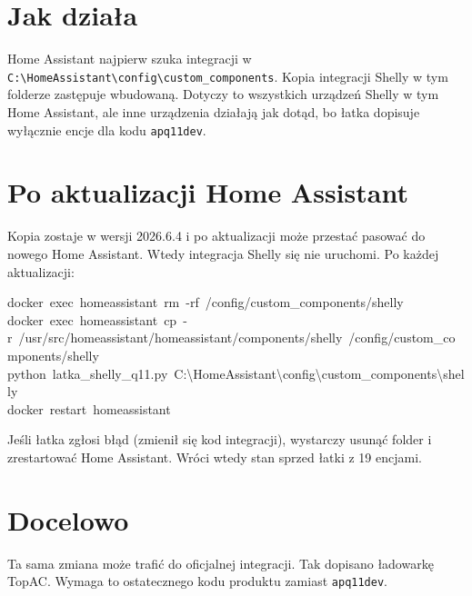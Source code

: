 \documentclass[11pt,a4paper]{article}
\begin{document}
\section*{Jak działa}

Home Assistant najpierw szuka integracji w \texttt{C:\allowbreak{}\textbackslash{}HomeAssistant\textbackslash{}config\textbackslash{}custom\_\allowbreak{}components}. Kopia integracji Shelly w tym folderze zastępuje wbudowaną. Dotyczy to wszystkich urządzeń Shelly w tym Home Assistant, ale inne urządzenia działają jak dotąd, bo łatka dopisuje wyłącznie encje dla kodu \texttt{apq11dev}.


\section*{Po aktualizacji Home Assistant}

Kopia zostaje w wersji 2026.6.4 i po aktualizacji może przestać pasować do nowego Home Assistant. Wtedy integracja Shelly się nie uruchomi. Po każdej aktualizacji:


\begin{kodbox}
\mbox{}docker\ exec\ homeassistant\ rm\ -rf\ /config/custom\_components/shelly\\
\mbox{}docker\ exec\ homeassistant\ cp\ -r\ /usr/src/homeassistant/homeassistant/components/shelly\ /config/custom\_co\\
\hspace*{1.2em}mponents/shelly\\
\mbox{}python\ latka\_shelly\_q11.py\ C:\textbackslash{}HomeAssistant\textbackslash{}config\textbackslash{}custom\_components\textbackslash{}shelly\\
\mbox{}docker\ restart\ homeassistant
\end{kodbox}

Jeśli łatka zgłosi błąd (zmienił się kod integracji), wystarczy usunąć folder i zrestartować Home Assistant. Wróci wtedy stan sprzed łatki z 19 encjami.


\section*{Docelowo}

Ta sama zmiana może trafić do oficjalnej integracji. Tak dopisano ładowarkę TopAC. Wymaga to ostatecznego kodu produktu zamiast \texttt{apq11dev}.
\end{document}
